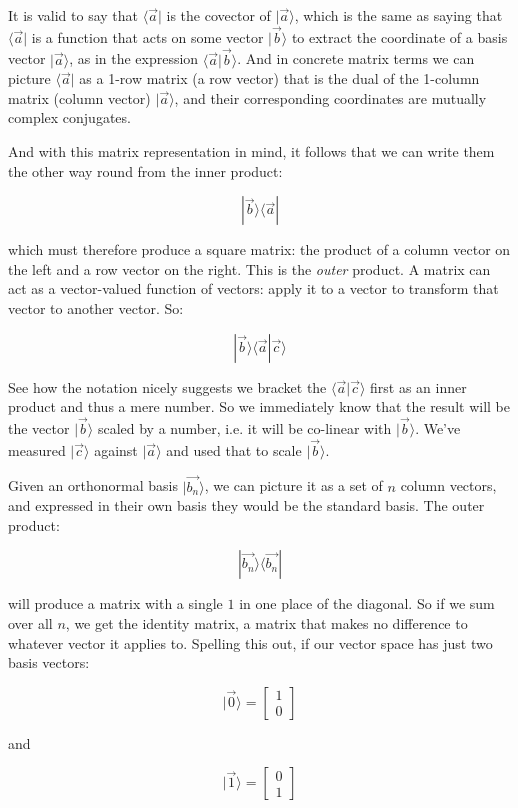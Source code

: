 It is valid to say that $\langle \vec{a}|$ is the covector of $|\vec{a} \rangle$, which is the same as saying that $\langle \vec{a}|$ is a function that acts on some vector $|\vec{b} \rangle$ to extract the coordinate of a basis vector $|\vec{a} \rangle$, as in the expression $\langle \vec{a}|\vec{b} \rangle$. And in concrete matrix terms we can picture $\langle \vec{a}|$ as a 1-row matrix (a row vector) that is the dual of the 1-column matrix (column vector) $|\vec{a} \rangle$, and their corresponding coordinates are mutually complex conjugates.

And with this matrix representation in mind, it follows that we can write them the other way round from the inner product:

$$|\vec{b} \rangle \langle \vec{a} |$$

which must therefore produce a square matrix: the product of a column vector on the left and a row vector on the right. This is the \textit{outer} product. A matrix can act as a vector-valued function of vectors: apply it to a vector to transform that vector to another vector. So:

$$|\vec{b} \rangle \langle \vec{a} | \vec{c} \rangle$$

See how the notation nicely suggests we bracket the $\langle \vec{a} | \vec{c} \rangle$ first as an inner product and thus a mere number. So we immediately know that the result will be the vector $|\vec{b} \rangle$ scaled by a number, i.e. it will be co-linear with $|\vec{b} \rangle$. We've measured $|\vec{c} \rangle$ against $|\vec{a} \rangle$ and used that to scale $|\vec{b} \rangle$.

Given an orthonormal basis $|\vec{b_n} \rangle$, we can picture it as a set of $n$ column vectors, and expressed in their own basis they would be the standard basis. The outer product:

$$|\vec{b_n} \rangle \langle \vec{b_n} |$$

will produce a matrix with a single $1$ in one place of the diagonal. So if we sum over all $n$, we get the identity matrix, a matrix that makes no difference to whatever vector it applies to. Spelling this out, if our vector space has just two basis vectors:

$$|\vec{0} \rangle = \begin{bmatrix} 1 \\ 0 \end{bmatrix}$$

and

$$|\vec{1} \rangle = \begin{bmatrix} 0 \\ 1 \end{bmatrix}$$

